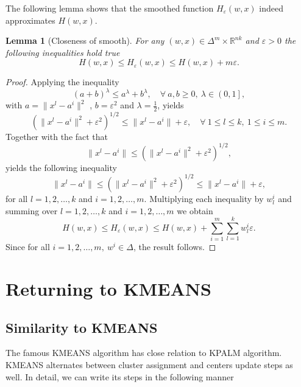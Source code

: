 \documentclass[11pt]{article}
\numberwithin{equation}{section}
\newtheorem{lemma}{Lemma}[proposition]
\begin{document}
The following lemma shows that the smoothed function $H_{\varepsilon}(w,x)$ indeed approximates $H(w,x)$.

\begin{lemma}[Closeness of smooth]
For any $(w,x) \in {\Delta}^m \times \mathbb{R}^{nk}$ and $\varepsilon > 0$ the following inequalities hold true
\begin{equation*}
	H(w,x) \leq H_{\varepsilon}(w,x) \leq H(w,x) + m\varepsilon .
\end{equation*}
\end{lemma}

\begin{proof}
Applying the inequality
\begin{equation*}
	\left( a+b \right)^{\lambda} \leq a^{\lambda} + b^{\lambda}, \quad \forall \: a,b \geq 0, \: \lambda \in \left( 0,1 \right] ,
\end{equation*}
with $a = \|x^l - a^i \|^2$ , $b = {\varepsilon}^2$ and $\lambda = \frac{1}{2}$, yields
\begin{equation*}
	\left(\|x^l - a^i \|^2 + {\varepsilon}^2 \right)^{1/2} \leq \|x^l - a^i \| + \varepsilon , \quad \forall \: 1 \leq l \leq k, \: 1 \leq i \leq m .
\end{equation*}
Together with the fact that
\begin{equation*}
	\|x^l - a^i \| \leq \left(\|x^l - a^i \|^2 + {\varepsilon}^2 \right)^{1/2},
\end{equation*}
yields the following inequality
\begin{equation*}
	\|x^l - a^i \| \leq \left(\|x^l - a^i \|^2 + {\varepsilon}^2 \right)^{1/2} \leq \|x^l - a^i \| + \varepsilon ,
\end{equation*}
for all $l=1,2, \ldots, k$ and $i=1,2, \ldots, m$.
Multiplying each inequality by $w^i_l$ and summing over $l=1,2, \ldots, k$ and $i=1,2, \ldots, m$ we obtain
\begin{equation*}
	H(w,x) \leq H_{\varepsilon}(w,x) \leq H(w,x) + \sum\limits_{i=1}^m \sum\limits_{l=1}^k w^i_l \varepsilon .
\end{equation*}
Since for all $i=1,2, \dots, m, \: w^i \in \Delta$, the result follows.
\end{proof}

\newpage


\section{Returning to KMEANS}
\subsection{Similarity to KMEANS}
The famous KMEANS algorithm has close relation to KPALM algorithm. KMEANS alternates between cluster assignment and centers update steps as well. In detail, we can write its steps in the following manner
\end{document}
